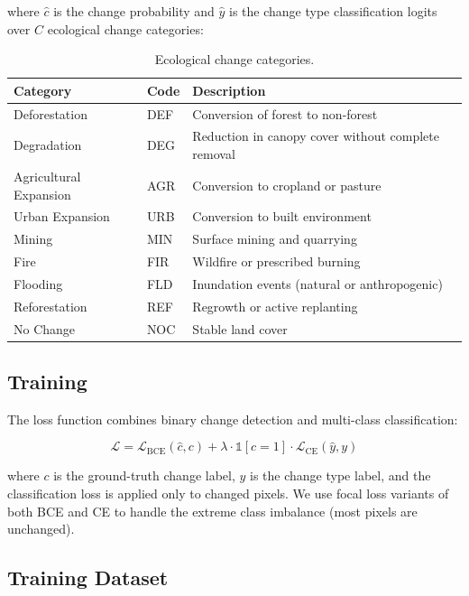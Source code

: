 \documentclass[11pt,a4paper]{article}
\begin{document}
\noindent where $\hat{c}$ is the change probability and $\hat{y}$ is the change type classification logits over $C$ ecological change categories:

\begin{table}[H]
\centering
\caption{Ecological change categories.}
\label{tab:change_categories}
\begin{tabularx}{\textwidth}{@{}llX@{}}
\toprule
\textbf{Category} & \textbf{Code} & \textbf{Description} \\
\midrule
Deforestation & DEF & Conversion of forest to non-forest \\
Degradation & DEG & Reduction in canopy cover without complete removal \\
Agricultural Expansion & AGR & Conversion to cropland or pasture \\
Urban Expansion & URB & Conversion to built environment \\
Mining & MIN & Surface mining and quarrying \\
Fire & FIR & Wildfire or prescribed burning \\
Flooding & FLD & Inundation events (natural or anthropogenic) \\
Reforestation & REF & Regrowth or active replanting \\
No Change & NOC & Stable land cover \\
\bottomrule
\end{tabularx}
\end{table}

\subsection{Training}

The loss function combines binary change detection and multi-class classification:

\begin{equation}
    \mathcal{L} = \mathcal{L}_{\text{BCE}}(\hat{c}, c) + \lambda \cdot \mathbb{1}[c=1] \cdot \mathcal{L}_{\text{CE}}(\hat{y}, y)
\end{equation}

\noindent where $c$ is the ground-truth change label, $y$ is the change type label, and the classification loss is applied only to changed pixels.
We use focal loss variants of both BCE and CE to handle the extreme class imbalance (most pixels are unchanged).

\subsection{Training Dataset}
\end{document}
